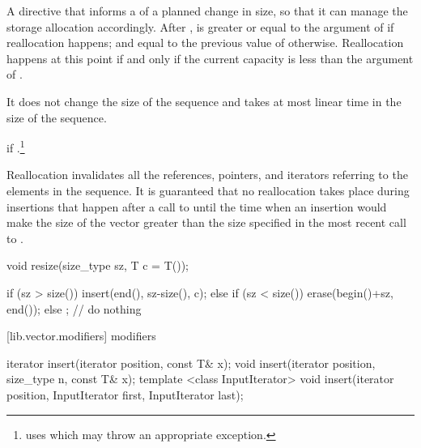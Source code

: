 \begin{itemdescr}
\pnum
\effects
A directive that informs a
of a planned change in size, so that it can manage the storage allocation accordingly.
After
,
is greater or equal to the argument of
if reallocation happens; and equal to the previous value of
otherwise.
Reallocation happens at this point if and only if the current capacity is less than the
argument of
.

\pnum
\complexity
It does not change the size of the sequence and takes at most linear
time in the size of the sequence.

\pnum
\throws
{} if .\footnote{ uses  which
may throw an appropriate exception.}

\pnum
\notes
Reallocation invalidates all the references, pointers, and iterators
referring to the elements in the sequence.
It is guaranteed that no reallocation takes place during insertions that happen
after a call to
until the time when an insertion would make the size of the vector
greater than the size specified in the most recent call to
.
\end{itemdescr}

%
\begin{itemdecl}
void resize(size_type sz, T c = T());
\end{itemdecl}

\begin{itemdescr}
\pnum
\effects
\begin{codeblock}
    if (sz > size())
      insert(end(), sz-size(), c);
    else if (sz < size())
      erase(begin()+sz, end());
    else
      ;                           // do nothing
\end{codeblock}
\end{itemdescr}

[lib.vector.modifiers]{ modifiers}

%
\begin{itemdecl}
iterator insert(iterator position, const T& x);
void     insert(iterator position, size_type n, const T& x);
template <class InputIterator>
  void insert(iterator position, InputIterator first, InputIterator last);
\end{itemdecl}

